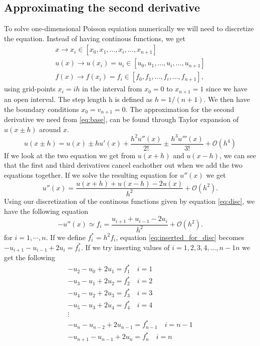 \documentclass[10pt, a4paper]{amsart}
\begin{document}
\subsection{Approximating the second derivative}
To solve one-dimensional Poisson equiation numerically we will need to discretize the equation. Instead of having continous functions, we get 
\begin{equation}\label{eq:disc}
	\begin{split}
		x \rightarrow x_i\in[x_0,x_1, \dots ,x_i,\dots ,x_{n+1}]\\
		u(x) \rightarrow u(x_i) = u_i \in[u_0,u_1, \dots ,u_i,\dots ,u_{n+1}]\\	
		f(x) \rightarrow f(x_i) = f_i \in[f_0,f_1, \dots ,f_i,\dots ,f_{n+1}],
	\end{split}
\end{equation}
using grid-points $x_i = ih$ in the interval from $x_0 = 0$ to $x_{n+1} = 1$ since we have an open interval. The step length h is defined as $h = 1/(n+1)$. We then have the boundary conditions $x_0 = v_{n+1} = 0$. The approximation for the second derivative we need from \ref{eq:base}, can be found through Taylor expansion of $u(x\pm h)$ around $x$.
\begin{equation}
	u(x\pm h) = u(x) \pm hu'(x) + \frac{h^2u''(x)}{2!} \pm \frac{h^3u'''(x)}{3!} + \mathcal{O}(h^4)\label{eq:taylor_exp}
\end{equation}
If we look at the two equation we get from $u(x+h)$ and $u(x-h)$, we can see that the first and third derivatives cancel eachother out when we add the two equations together. If we solve the resulting equation for $u''(x)$ we get 
\begin{equation}
u''(x) = \frac{u(x+h) + u(x-h) - 2u(x)}{h^2} + \mathcal{O}(h^2).\label{eq:second_der}
\end{equation}
Using our discretization of the continous functions given by equation \ref{eq:disc}, we have the following equation
\begin{equation}
-u''(x) \simeq f_i = \frac{u_{i+1} + u_{i-1} -2u_i}{h^2} +\mathcal{O}(h^2). \label{eq:inserted_for_disc}
\end{equation}
for $i = 1,\cdots , n$. 
If we define $f^*_i = h^2f_i$, equation \ref{eq:inserted_for_disc} becomes $-u_{i+1} - u_{i-1} +2u_i = f^*_i$. If we try inserting values of $i= 1, 2, 3, 4,\dots , n-1 n$  we get the following
\begin{equation}\label{eq:disc_ins_i}
	\begin{split}
		-u_2 - u_0 + 2u_1 = f^*_1 \quad i = 1\\
		-u_3 - u_1 + 2u_2 = f^*_2 \quad i = 2\\
		-u_4 - u_2 + 2u_3 = f^*_3 \quad i = 3\\
		-u_5 - u_3 + 2u_4 = f^*_4 \quad i = 4\\
		\vdots \\
		-u_n - u_{n-2} + 2u_{n-1} = f^*_{n-1} \quad i = n-1\\
		-u_{n+1} - u_{n-1} + 2u_n = f^*_n \quad i = n
	\end{split}
\end{equation}
\end{document}
